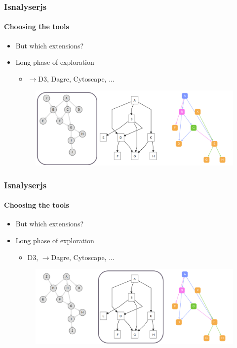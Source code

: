 \documentclass[9pt]{beamer}
\begin{document}
\begin{frame}
\frametitle{Isnalyserjs}
\framesubtitle{Choosing the tools}
\begin{itemize}%
	\item But which extensions?
	\item Long phase of exploration
	\pause
	\begin{itemize}
		\item $\rightarrow$D3, Dagre, Cytoscape, ...
	\end{itemize}
	\begin{figure}
	\flushleft
	\includegraphics[width=1\linewidth]{figures/js_libs_1.pdf}
\end{figure}
\end{itemize}
\end{frame} 
\begin{frame}
\frametitle{Isnalyserjs}
\framesubtitle{Choosing the tools}
\begin{itemize}%
	\item But which extensions?
	\item Long phase of exploration
	\begin{itemize}
		\item D3, $\rightarrow$Dagre, Cytoscape, ...
	\end{itemize}
	\begin{figure}
		\flushleft
		\includegraphics[width=1\linewidth]{figures/js_libs_2.pdf}
	\end{figure}
\end{itemize}
\end{frame} 
\end{document}
